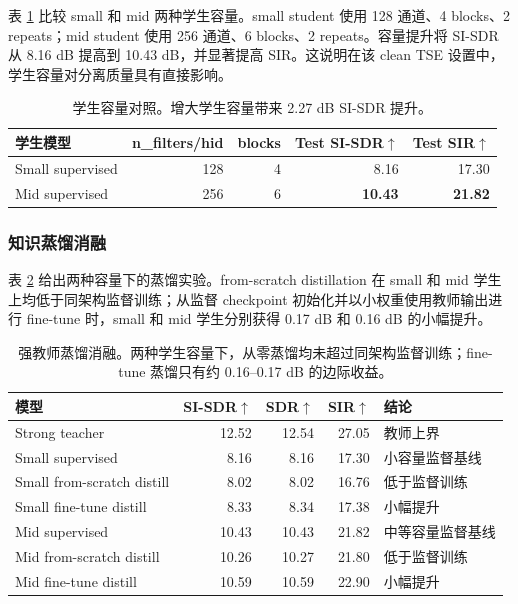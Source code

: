 \documentclass[UTF8,zihao=5,a4paper]{ctexart}
\newcommand{\sisdr}{SI-SDR}
\begin{document}
表 \ref{tab:capacity} 比较 small 和 mid 两种学生容量。small student 使用 128 通道、4 blocks、2 repeats；mid student 使用 256 通道、6 blocks、2 repeats。容量提升将 \sisdr{} 从 8.16 dB 提高到 10.43 dB，并显著提高 SIR。这说明在该 clean TSE 设置中，学生容量对分离质量具有直接影响。

\begin{table}[H]
\centering
\begin{tabular}{lrrrr}
\toprule
学生模型 & n\_filters/hid & blocks & Test \sisdr{}$\uparrow$ & Test SIR$\uparrow$ \\
\midrule
Small supervised & 128 & 4 & 8.16 & 17.30 \\
Mid supervised & 256 & 6 & \textbf{10.43} & \textbf{21.82} \\
\bottomrule
\end{tabular}
\caption{学生容量对照。增大学生容量带来 2.27 dB \sisdr{} 提升。}
\label{tab:capacity}
\end{table}

\subsubsection{知识蒸馏消融}

表 \ref{tab:distill-failure} 给出两种容量下的蒸馏实验。from-scratch distillation 在 small 和 mid 学生上均低于同架构监督训练；从监督 checkpoint 初始化并以小权重使用教师输出进行 fine-tune 时，small 和 mid 学生分别获得 0.17 dB 和 0.16 dB 的小幅提升。

\begin{table}[H]
\centering
\begin{tabular}{lrrrl}
\toprule
模型 & \sisdr{}$\uparrow$ & SDR$\uparrow$ & SIR$\uparrow$ & 结论 \\
\midrule
Strong teacher & 12.52 & 12.54 & 27.05 & 教师上界 \\
Small supervised & 8.16 & 8.16 & 17.30 & 小容量监督基线 \\
Small from-scratch distill & 8.02 & 8.02 & 16.76 & 低于监督训练 \\
Small fine-tune distill & 8.33 & 8.34 & 17.38 & 小幅提升 \\
Mid supervised & 10.43 & 10.43 & 21.82 & 中等容量监督基线 \\
Mid from-scratch distill & 10.26 & 10.27 & 21.80 & 低于监督训练 \\
Mid fine-tune distill & 10.59 & 10.59 & 22.90 & 小幅提升 \\
\bottomrule
\end{tabular}
\caption{强教师蒸馏消融。两种学生容量下，从零蒸馏均未超过同架构监督训练；fine-tune 蒸馏只有约 0.16--0.17 dB 的边际收益。}
\label{tab:distill-failure}
\end{table}
\end{document}
